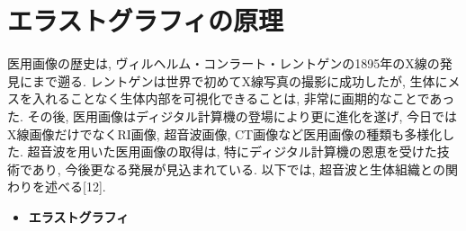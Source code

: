 \section{エラストグラフィの原理}
医用画像の歴史は, ヴィルヘルム・コンラート・レントゲンの1895年のX線の発見にまで遡る. レントゲンは世界で初めてX線写真の撮影に成功したが,  生体にメスを入れることなく生体内部を可視化できることは, 非常に画期的なことであった. その後, 医用画像はディジタル計算機の登場により更に進化を遂げ, 今日ではX線画像だけでなくRI画像, 超音波画像, CT画像など医用画像の種類も多様化した. 超音波を用いた医用画像の取得は, 特にディジタル計算機の恩恵を受けた技術であり, 今後更なる発展が見込まれている. 以下では, 超音波と生体組織との関わりを述べる[12].
\begin{itemize}
\item{\bf エラストグラフィ}
\end{itemize}



